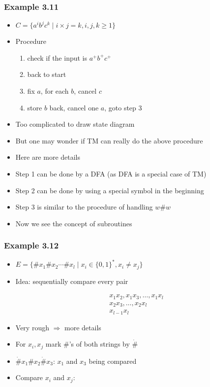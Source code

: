 \begin{frame}[allowframebreaks] \frametitle{Example 3.11}
  \begin{itemize}
\item $C=\{a^i b^j c^k\mid i\times j=k, i,j,k \geq 1\}$
\item Procedure
  \begin{enumerate}
  \item check if the input is $a^+ b^+ c^+$
  \item back to start
  \item fix $a$, for each $b$, cancel $c$
  \item store $b$ back, cancel one $a$, goto step 3
  \end{enumerate}
\item Too complicated to draw state diagram
\item But one may wonder if TM can really do the above procedure
\item Here are more details
\item Step 1 can be done by a DFA (as DFA is a special case of TM)
\item Step 2 can be done by using a special symbol in the beginning
\item Step 3 is similar to the procedure of handling $w\#w$
\item [] Now we see the concept of subroutines
\end{itemize}\end{frame} \begin{frame}[allowframebreaks] \frametitle{Example 3.12}
  \begin{itemize}
\item $E=\{\#x_1\# x_2 \cdots \# x_l\mid x_i \in 
\{0,1\}^*, x_i \neq x_j\}$
\item Idea: sequentially compare every pair

  \begin{equation*}
    \begin{split}
& x_1 x_2, x_1 x_3, \ldots, x_1 x_l \\
& x_2 x_3, \ldots, x_2 x_l \\
& x_{l-1} x_l
\end{split}
\end{equation*}
\item Very rough $\Rightarrow$ more details

\item [] For $x_i, x_j$ mark \#'s of both strings
by $\dot{\#}$

\item [] $\dot{\#}x_1\#x_2 \dot{\#}x_3$: $x_1$ and $x_3$
being compared
\item Compare $x_i$ and $x_j$:


\end{itemize}
\end{frame}
